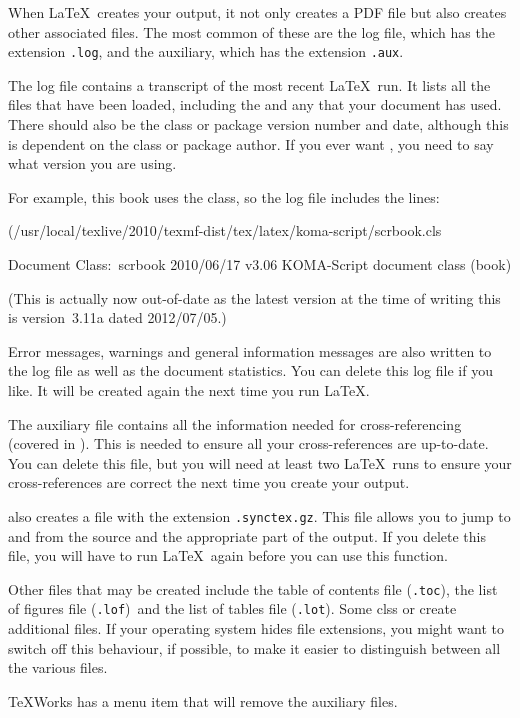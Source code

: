 When \LaTeX\ creates your \gls{output}, it not only creates a PDF
file but also creates other associated files. The most common of these are
the log file\indexLOG, which has the extension \texttt{.log}, and
the \gls*{auxiliary}, which has the extension \texttt{.aux}.

The log file contains a transcript of the most recent \LaTeX\ run.
It lists all the files that have been loaded, including the  
and any  that your document has used.
There should also be the class or package version number and date,
although this is dependent on the class or package author. If you
ever want , you need to say what
version you are using.

For example, this book uses the 
class, so the log file includes the lines:
\begin{flushleft}\ttfamily
\noindent
(\slash usr\slash local\slash texlive\slash 2010\slash texmf-dist\slash tex\slash latex\slash koma-script\slash scrbook.cls\par
\noindent
Document Class:\ scrbook 2010\slash 06\slash 17 v3.06 KOMA-Script document class (book)\par
\end{flushleft}
(This is actually now out-of-date as the latest version at the time
of writing this is version~3.11a dated 2012/07/05.)

Error messages, warnings and general information messages are also
written to the log file as well as the document statistics. You can
delete this log file if you like. It will be created again the next
time you run \LaTeX.

The auxiliary file contains all the information needed for
cross-referencing (covered in ). This is
needed to ensure all your cross-references are up-to-date. You can
delete this file, but you will need at least two \LaTeX\ runs to
ensure your cross-references are correct the next time you create
your \gls{output}.

 also creates a file with the extension
\texttt{.synctex.gz}\indexSYNCTEX. This file allows you to jump to
and from the \gls{source} and the appropriate part of the
\gls{output}. If you delete this file, you will have to run \LaTeX\
again before you can use this function.

Other files that may be created include the table of contents file
(\texttt{.toc})\indexTOC, the list of figures file
(\texttt{.lof})\indexLOF\ and the list of tables file (\texttt{.lot})\indexLOT.
Some \glsunset{cls}\glspl{cls}\glsreset{cls} or \htmlref{packages}{sec:packages} create 
additional files. If your operating system
hides file extensions, you might want to switch off this behaviour,
if possible, to make it easier to distinguish between all the
various files.

TeXWorks has a menu item \menuto{}
that will remove the auxiliary files.
